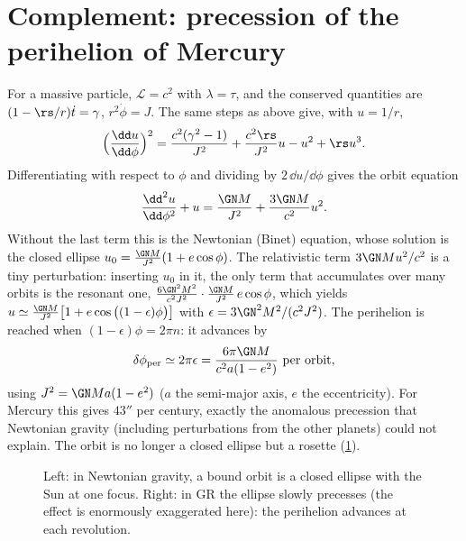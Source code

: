 \section{Complement: precession of the perihelion of Mercury}

For a massive particle, $\mathcal L=c^2$ with $\lambda=\tau$, and the conserved quantities are $(1-\rs/r)\dot t=\gamma$, $r^2\dot\phi=J$. The same steps as above give, with $u=1/r$,
\[
  \Big(\frac{\dd u}{\dd\phi}\Big)^2=\frac{c^2(\gamma^2-1)}{J^2}+\frac{c^2\rs}{J^2}u-u^2+\rs u^3 .
\]
Differentiating with respect to $\phi$ and dividing by $2\,\dd u/\dd\phi$ gives the orbit equation
\begin{equation}
  \frac{\dd^2u}{\dd\phi^2}+u=\frac{\GN M}{J^2}+\frac{3\GN M}{c^2}u^2 .
\end{equation}
Without the last term this is the Newtonian (Binet) equation, whose solution is the closed ellipse $u_0=\frac{\GN M}{J^2}(1+e\cos\phi)$. The relativistic term $3\GN Mu^2/c^2$ is a tiny perturbation: inserting $u_0$ in it, the only term that accumulates over many orbits is the resonant one, $\frac{6\GN^2M^2}{c^2J^2}\cdot\frac{\GN M}{J^2}\,e\cos\phi$, which yields $u\simeq\frac{\GN M}{J^2}\big[1+e\cos\big((1-\epsilon)\phi\big)\big]$ with $\epsilon=3\GN^2M^2/(c^2J^2)$. The perihelion is reached when $(1-\epsilon)\phi=2\pi n$: it advances by
\begin{equation}
  \delta\phi_{\rm per}\simeq2\pi\epsilon=\frac{6\pi\GN M}{c^2a(1-e^2)}\ \text{per orbit},
\end{equation}
using $J^2=\GN Ma(1-e^2)$ ($a$ the semi-major axis, $e$ the eccentricity). For Mercury this gives $43''$ per century, exactly the anomalous precession that Newtonian gravity (including perturbations from the other planets) could not explain. The orbit is no longer a closed ellipse but a rosette (\cref{fig:mercury}).

\begin{figure}[ht]
\centering
{}
\hspace{1.5cm}
\caption{Left: in Newtonian gravity, a bound orbit is a closed ellipse with the Sun at one focus. Right: in GR the ellipse slowly precesses (the effect is enormously exaggerated here): the perihelion advances at each revolution.}
\label{fig:mercury}
\end{figure}

